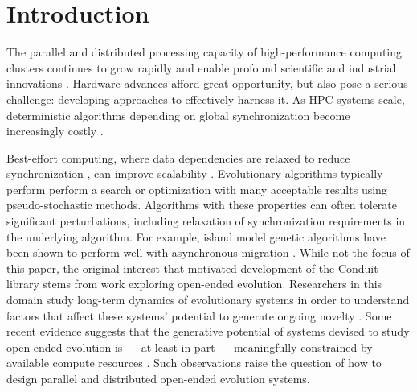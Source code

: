 \section{Introduction}

The parallel and distributed processing capacity of high-performance computing clusters continues to grow rapidly and enable profound scientific and industrial innovations \cite{gagliardi2019international}.    
Hardware advances afford great opportunity, but also pose a serious challenge: developing approaches to effectively harness it.
As HPC systems scale, deterministic algorithms depending on global synchronization become increasingly costly \cite{gropp2013programming,dongarra2014applied}.

Best-effort computing, where data dependencies are relaxed to reduce synchronization \cite{chakradhar2010best}, can improve scalability \cite{meng2009best}.
Evolutionary algorithms typically perform perform a search or optimization with many acceptable results using pseudo-stochastic methods.
Algorithms with these properties can often tolerate significant perturbations, including relaxation of synchronization requirements in the underlying algorithm.
For example, island model genetic algorithms have been shown to perform well with asynchronous migration \cite{izzo2009parallel}.
While not the focus of this paper, the original interest that motivated development of the Conduit library stems from work exploring open-ended evolution.
Researchers in this domain study long-term dynamics of evolutionary systems in order to understand factors that affect these systems' potential to generate ongoing novelty \cite{taylor2016open}.
Some recent evidence suggests that the generative potential of systems devised to study open-ended evolution is --- at least in part --- meaningfully constrained by available compute resources \cite{channon2019maximum}.
Such observations raise the question of how to design parallel and distributed open-ended evolution systems.

